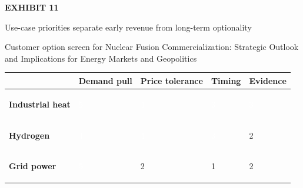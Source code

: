 \documentclass[10pt,a4paper]{article}
\begin{document}
\clearpage
{\textcolor{BOGreen}{\scriptsize\bfseries EXHIBIT 11}}\par\vspace{4pt}
{\sffamily\fontsize{17}{21}\selectfont\color{BONavy} Use-case priorities separate early revenue from long-term optionality}\par
{\small\color{BOText} Customer option screen for Nuclear Fusion Commercialization: Strategic Outlook and Implications for Energy Markets and Geopolitics}\par\vspace{6pt}
{\scriptsize\begin{tabular}{p{38mm}>{\centering\arraybackslash}p{21mm}>{\centering\arraybackslash}p{21mm}>{\centering\arraybackslash}p{21mm}>{\centering\arraybackslash}p{21mm}}
 & {\bfseries Demand pull} & {\bfseries Price tolerance} & {\bfseries Timing} & {\bfseries Evidence} \\
\hline
{\bfseries Industrial heat} & \colorbox{BOGreen}{\textcolor{white}{\strut\hspace{5pt}5\hspace{5pt}}} & \colorbox{BOGreen}{\textcolor{white}{\strut\hspace{5pt}4\hspace{5pt}}} & \colorbox{BOBlue}{\textcolor{white}{\strut\hspace{5pt}3\hspace{5pt}}} & \colorbox{BOBlue}{\textcolor{white}{\strut\hspace{5pt}3\hspace{5pt}}} \\
{\bfseries Hydrogen} & \colorbox{BOGreen}{\textcolor{white}{\strut\hspace{5pt}4\hspace{5pt}}} & \colorbox{BOGreen}{\textcolor{white}{\strut\hspace{5pt}4\hspace{5pt}}} & \colorbox{BOBlue}{\textcolor{white}{\strut\hspace{5pt}3\hspace{5pt}}} & \colorbox{BOLight}{\textcolor{BOText}{\strut\hspace{5pt}2\hspace{5pt}}} \\
{\bfseries Grid power} & \colorbox{BOGreen}{\textcolor{white}{\strut\hspace{5pt}5\hspace{5pt}}} & \colorbox{BOLight}{\textcolor{BOText}{\strut\hspace{5pt}2\hspace{5pt}}} & \colorbox{BOLight}{\textcolor{BOText}{\strut\hspace{5pt}1\hspace{5pt}}} & \colorbox{BOLight}{\textcolor{BOText}{\strut\hspace{5pt}2\hspace{5pt}}} \\

\end{tabular}}
\end{document}
